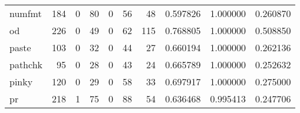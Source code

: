 \begin{tabular}{lrrrrrrrrr}
numfmt    &                                                184 &                                                  0 &                                                 80 &                                                  0 &                                                 56 &                                                 48 &                                           0.597826 &                               1.000000 &                             0.260870 \\
od        &                                                226 &                                                  0 &                                                 49 &                                                  0 &                                                 62 &                                                115 &                                           0.768805 &                               1.000000 &                             0.508850 \\
paste     &                                                103 &                                                  0 &                                                 32 &                                                  0 &                                                 44 &                                                 27 &                                           0.660194 &                               1.000000 &                             0.262136 \\
pathchk   &                                                 95 &                                                  0 &                                                 28 &                                                  0 &                                                 43 &                                                 24 &                                           0.665789 &                               1.000000 &                             0.252632 \\
pinky     &                                                120 &                                                  0 &                                                 29 &                                                  0 &                                                 58 &                                                 33 &                                           0.697917 &                               1.000000 &                             0.275000 \\
pr        &                                                218 &                                                  1 &                                                 75 &                                                  0 &                                                 88 &                                                 54 &                                           0.636468 &                               0.995413 &                             0.247706 \\

\end{tabular}
